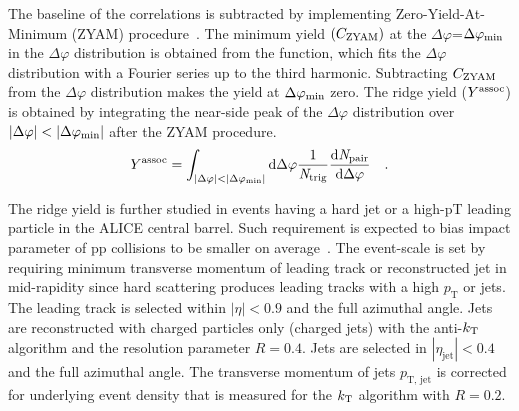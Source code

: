 The baseline of the correlations is subtracted by implementing Zero-Yield-At-Minimum (ZYAM) procedure~\cite{Ajitanand:2005jj}. The minimum yield $(C_{\rm{ZYAM}})$ at the $\Delta\varphi$=$\Delta\varphi_{\rm{min}}$ in the $\Delta\varphi$ distribution is obtained from the function, which fits the $\Delta\varphi$ distribution with a Fourier series up to the third harmonic. Subtracting $C_{\rm{ZYAM}}$ from the $\Delta\varphi$ distribution makes the yield at $\Delta\varphi_{\rm{min}}$ zero. The ridge yield ($Y^{\rm{assoc}}$) is obtained by integrating the near-side peak of the $\Delta\varphi$ distribution over $|\Delta\varphi|<|\Delta\varphi_{\rm{min}}|$ after the ZYAM procedure.
\begin{eqnarray}
Y^{\rm{assoc}} = \int_{|\Delta \varphi| < |\Delta\varphi_{\rm{min}}| } \rm{d} \Delta\varphi \frac{1}{\it{N}_{\rm{trig}}} \frac{ \rm{d}\it{}N_{\rm{pair}} }{ \rm{d}\Delta\varphi } \quad.
\end{eqnarray}

The ridge yield is further studied in events having a hard jet or a high-pT leading particle in the ALICE central barrel. Such requirement is expected to bias impact parameter of pp collisions to be smaller on average~\cite{Sjostrand:1986ep,Frankfurt:2010ea}.
The event-scale is set by requiring minimum transverse momentum of leading track or reconstructed jet in mid-rapidity since hard scattering produces leading tracks with a high $p_\mathrm{T}$ or jets. The leading track is selected within $|\eta|<0.9$ and the full azimuthal angle. Jets are reconstructed with charged particles only (charged jets) with the anti-$k_{\rm{T}}$ algorithm and the resolution parameter $R = 0.4$. Jets are selected in $|\eta_\mathrm{jet}|<0.4$ and the full azimuthal angle. The transverse momentum of jets $p_\mathrm{T,\,jet}$ is corrected for underlying event density that is measured for the $k_{\rm{T}}$ algorithm with $R = 0.2$. 

